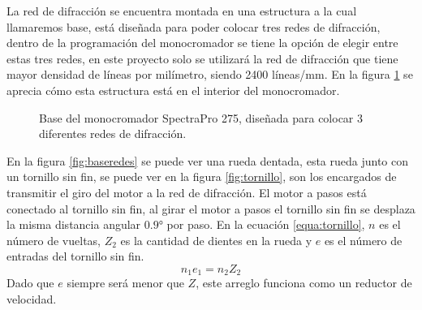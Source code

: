 La red de difracción se encuentra montada en una estructura a la cual llamaremos base, está diseñada para poder colocar tres redes de difracción, dentro de la programación del monocromador se tiene la opción de elegir entre estas tres redes, en este proyecto solo se utilizará la red de difracción que tiene mayor densidad de líneas por milímetro, siendo 2400 líneas/mm. En la figura \ref{fig:basered2} se aprecia cómo esta estructura está en el interior del monocromador.
\begin{figure}[h]
	\centering
	\caption{Base del monocromador SpectraPro 275, diseñada para colocar 3 diferentes redes de difracción.}
	\label{fig:basered2}
\end{figure}

En la figura \ref{fig:baseredes} se puede ver una rueda dentada, esta rueda junto con un tornillo sin fin, se puede ver en la figura \ref{fig:tornillo}, son los encargados de transmitir el giro del motor a la red de difracción. 
El motor a pasos está conectado al tornillo sin fin, al girar el motor a pasos el tornillo sin fin se desplaza la misma distancia angular $0.9°$ por paso. En la ecuación \ref{equa:tornillo}, $n$ es el número de vueltas, $Z_2$ es la cantidad de dientes en la rueda y $e$ es el número de entradas del tornillo sin fin.  
\begin{equation}
	n_1 e_1 = n_2 Z_2
	\label{equa:tornillo}
\end{equation}
Dado que $e$ siempre será menor que $Z$, este arreglo funciona como un reductor de velocidad.

